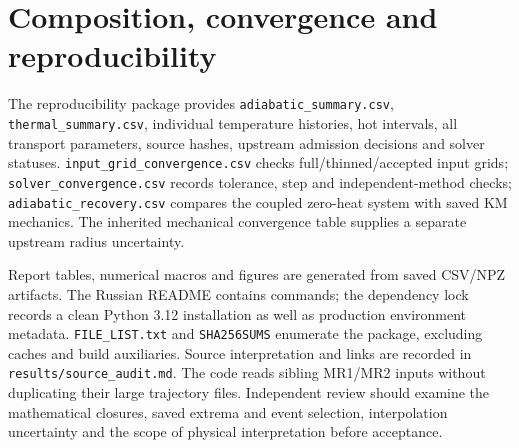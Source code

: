 \documentclass[10pt,a4paper]{article}
\begin{document}
\section{Composition, convergence and reproducibility}\label{app:composition}
\begin{table}[H]\centering\scriptsize
\caption{Composition sensitivity with $\eta=1$. Pressure and mass density are evaluated at the coupled temperature peak; their large formal values do not validate an ideal-gas EOS.}

\end{table}
\begin{table}[H]\centering\small
\caption{Production versus tighter integration for the principal air-like cases, at the same mechanical input where applicable. Input interpolation sensitivity is a separate error component.}

\end{table}
The reproducibility package provides \texttt{adiabatic\_summary.csv},
\texttt{thermal\_summary.csv}, individual temperature histories, hot intervals,
all transport parameters, source hashes, upstream admission decisions and solver statuses.
\texttt{input\_grid\_convergence.csv} checks full/thinned/accepted input grids;
\texttt{solver\_convergence.csv} records tolerance, step and independent-method checks;
\texttt{adiabatic\_recovery.csv} compares the coupled zero-heat system with saved KM mechanics.
The inherited mechanical convergence table supplies a separate upstream radius uncertainty.

Report tables, numerical macros and figures are generated from saved CSV/NPZ artifacts.
The Russian README contains commands; the dependency lock records a clean Python 3.12
installation as well as production environment metadata. \texttt{FILE\_LIST.txt} and
\texttt{SHA256SUMS} enumerate the package, excluding caches and build auxiliaries.
Source interpretation and links are recorded in \texttt{results/source\_audit.md}.
The code reads sibling MR1/MR2 inputs without duplicating their large trajectory files.
Independent review should examine the mathematical closures, saved extrema and event
selection, interpolation uncertainty and the scope of physical interpretation before acceptance.
\end{document}
